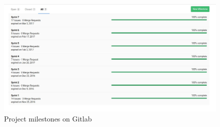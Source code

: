 \begin{figure}[H]
\begin{center}
\includegraphics[width=15cm]{figures/planning_milestones}
\end{center}
\caption{Project milestones on Gitlab}
\label{fig:planning_milestones}
\end{figure}
